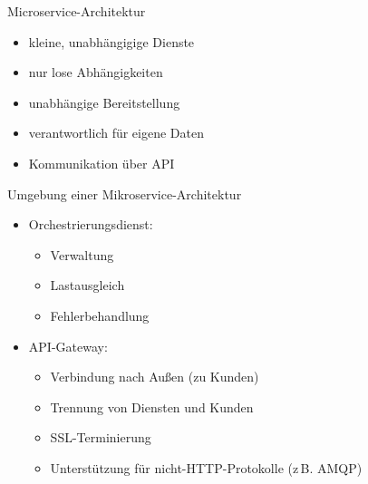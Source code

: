 

\begin{flashcard}[]{Microservice-Architektur}
  \begin{itemize}
    \item kleine, unabhängigige Dienste
    \item nur lose Abhängigkeiten
    \item unabhängige Bereitstellung
    \item verantwortlich für eigene Daten
    \item Kommunikation über API
  \end{itemize}
\end{flashcard}

\begin{flashcard}[]{Umgebung einer Mikroservice-Architektur}
  \begin{itemize}
    \item Orchestrierungsdienst:
      \begin{itemize}
        \item Verwaltung
        \item Lastausgleich
        \item Fehlerbehandlung
      \end{itemize}
    \item API-Gateway:\newline
      \begin{itemize}
        \item Verbindung nach Außen (zu Kunden)
        \item Trennung von Diensten und Kunden
        \item SSL-Terminierung
        \item Unterstützung für nicht-HTTP-Protokolle (z\,B. AMQP)
      \end{itemize}
  \end{itemize}
\end{flashcard}

